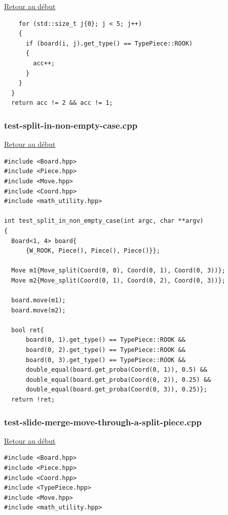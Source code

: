 {\begin{frame}[fragile]
\hyperlink{conclusion}{Retour au début}\newline
\begin{verbatim}
    for (std::size_t j{0}; j < 5; j++)
    {
      if (board(i, j).get_type() == TypePiece::ROOK)
      {
        acc++;
      }
    }
  }
  return acc != 2 && acc != 1;

\end{verbatim}
\end{frame}

\begin{frame}[fragile]
\label{testsplitinnonemptycase.cpp}
\frametitle{test-split-in-non-empty-case.cpp}
\hyperlink{conclusion}{Retour au début}\newline
\begin{verbatim}
#include <Board.hpp>
#include <Piece.hpp>
#include <Move.hpp>
#include <Coord.hpp>
#include <math_utility.hpp>

int test_split_in_non_empty_case(int argc, char **argv)
{
  Board<1, 4> board{
      {W_ROOK, Piece(), Piece(), Piece()}};

  Move m1{Move_split(Coord(0, 0), Coord(0, 1), Coord(0, 3))};
  Move m2{Move_split(Coord(0, 1), Coord(0, 2), Coord(0, 3))};

  board.move(m1);
  board.move(m2);

  bool ret{
      board(0, 1).get_type() == TypePiece::ROOK &&
      board(0, 2).get_type() == TypePiece::ROOK &&
      board(0, 3).get_type() == TypePiece::ROOK &&
      double_equal(board.get_proba(Coord(0, 1)), 0.5) &&
      double_equal(board.get_proba(Coord(0, 2)), 0.25) &&
      double_equal(board.get_proba(Coord(0, 3)), 0.25)};
  return !ret;

\end{verbatim}
\end{frame}

\begin{frame}[fragile]
\label{testslidemergemovethroughasplitpiece.cpp}
\frametitle{test-slide-merge-move-through-a-split-piece.cpp}
\hyperlink{conclusion}{Retour au début}\newline
\begin{verbatim}
#include <Board.hpp>
#include <Piece.hpp>
#include <Coord.hpp>
#include <TypePiece.hpp>
#include <Move.hpp>
#include <math_utility.hpp>


\end{verbatim}
\end{frame}}
